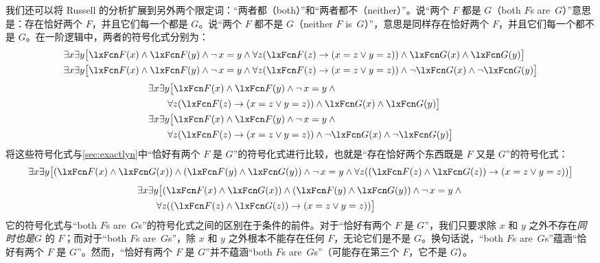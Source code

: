 我们还可以将 Russell 的分析扩展到另外两个限定词：“两者都（both）”和“两者都不（neither）”。说“两个 $F$ 都是 $G$（both $F$s are~$G$）”意思是：存在恰好两个 $F$，并且它们每一个都是 $G$。说“两个 $F$ 都不是 $G$（neither $F$ is~$G$）”，意思是同样存在恰好两个 $F$，并且它们每一个都不是 $G$。在一阶逻辑中，两者的符号化式分别为：
\ifHTMLtarget
\begin{align*}
	& \exists x\exists y\bigl[\atom{F}{x} \eand \atom{F}{y} \eand \enot\, {x=y} \eand
	\forall z(\atom{F}{z} \eif (x = z \lor y = z)) \eand \atom{G}{x} \eand \atom{G}{y}\bigr]\\
	& \exists x\exists y\bigl[\atom{F}{x} \eand \atom{F}{y} \eand \enot\, {x=y} \eand
	\forall z(\atom{F}{z} \eif (x = z \lor y = z)) \eand \enot \atom{G}{x} \eand \enot \atom{G}{y}\bigr]
\end{align*}
\else
\begin{align*}
	& \exists x\exists y\bigl[\atom{F}{x} \eand \atom{F}{y} \eand \enot\, {x=y} \eand {}\\
	& \qquad \forall z(\atom{F}{z} \eif (x = z \lor y = z)) \eand \atom{G}{x} \eand \atom{G}{y}\bigr]\\
	& \exists x\exists y\bigl[\atom{F}{x} \eand \atom{F}{y} \eand \enot\, {x=y} \eand  {}\\
	& \qquad\forall z(\atom{F}{z} \eif (x = z \lor y = z)) \eand \enot \atom{G}{x} \eand \enot \atom{G}{y}\bigr]
\end{align*}
\fi
将这些符号化式与\cref{sec:exactlyn}中“恰好有两个 $F$ 是 $G$”的符号化式进行比较，也就是“存在恰好两个东西既是 $F$ 又是 $G$”的符号化式：
\ifHTMLtarget
	\[
		\exists x\exists y\bigl[(\atom{F}{x} \eand \atom{G}{x}) \eand (\atom{F}{y} \eand \atom{G}{y}) \eand \enot\, {x=y} \eand
		\forall z((\atom{F}{z} \eand \atom{G}{z}) \eif (x = z \lor y = z))\bigr]
	\]
\else
\begin{align*}
	& \exists x\exists y\bigl[(\atom{F}{x} \eand \atom{G}{x}) \eand (\atom{F}{y} \eand \atom{G}{y}) \eand \enot\, {x=y} \eand {}\\
	& \qquad\forall z((\atom{F}{z} \eand \atom{G}{z}) \eif (x = z \lor y = z))\bigr]
\end{align*}
\fi
它的符号化式与“both $F$s are~$G$s”的符号化式之间的区别在于条件的前件。对于“恰好有两个 $F$ 是 $G$”，我们只要求除 $x$ 和 $y$ 之外不存在\emph{同时也是}$G$ 的 $F$；而对于“both $F$s are~$G$s”，除 $x$ 和 $y$ 之外根本不能存在任何 $F$，无论它们是不是 $G$。换句话说，“both $F$s are~$G$s”蕴涵“恰好有两个 $F$ 是 $G$”。然而，“恰好有两个 $F$ 是 $G$”并不蕴涵“both $F$s are~$G$s”（可能存在第三个 $F$，它不是 $G$）。

